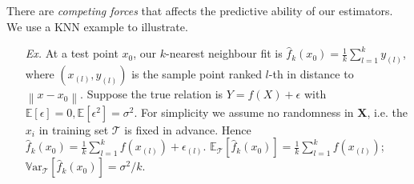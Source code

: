 \documentclass[a4paper, 11pt]{article}
\begin{document}
There are \emph{competing forces} that affects the predictive ability of our estimators. We use a KNN example to illustrate.
\begin{itemize}
	\item[\textit{Ex.}] At a test point $x_0$, our $k$-nearest neighbour fit is $\hat{f}_k(x_0)=\frac{1}{k}\sum_{l=1}^k y_{(l)}$, where $(x_{(l)},y_{(l)})$ is the sample point ranked $l$-th in distance to $\left\|x-x_0\right\|$. Suppose the true relation is $Y=f(X)+\epsilon$ with $\mathbb{E}\left[\epsilon\right]=0, \mathbb{E}\left[\epsilon^2\right]=\sigma^2$. For simplicity we assume no randomness in $\bm{X}$, i.e. the $x_i$ in training set $\mathcal{T}$ is fixed in advance. Hence $\hat{f}_k(x_0)=\frac{1}{k}\sum_{l=1}^k f(x_{(l)})+\epsilon_{(l)}$. $\mathbb{E}_{\mathcal{T}}\left[\hat{f}_k(x_0)\right]=\frac{1}{k}\sum_{l=1}^{k}f(x_{(l)})$; $\mathrm{\mathbb{V}ar}_{\mathcal{T}}\left[\hat{f}_k(x_0)\right]=\sigma^2/k$.


\end{itemize}
\end{document}
